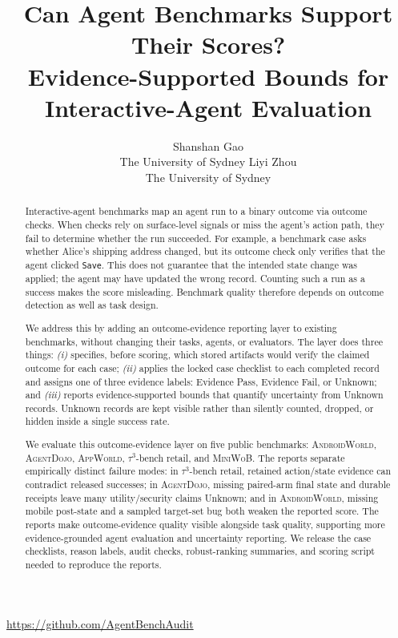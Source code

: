 \documentclass{article}
\title{Can Agent Benchmarks Support Their Scores?\\
\large Evidence-Supported Bounds for Interactive-Agent Evaluation}
\author{
Shanshan Gao\\
The University of Sydney
\And
Liyi Zhou\\
The University of Sydney
}
\date{}
\newcommand{\agentdojo}{\textsc{AgentDojo}\xspace}
\newcommand{\appworld}{\textsc{AppWorld}\xspace}
\newcommand{\tauthree}{\(\tau^3\)-bench retail\xspace}
\newcommand{\androidworld}{\textsc{AndroidWorld}\xspace}
\newcommand{\miniwob}{\textsc{MiniWoB}\xspace}
\newcommand{\evidencePass}{Evidence Pass\xspace}
\newcommand{\evidenceFail}{Evidence Fail\xspace}
\newcommand{\unknownLabel}{Unknown\xspace}
\begin{document}
\maketitle

\begin{abstract}
Interactive-agent benchmarks map an agent run to a binary outcome via outcome
checks. When checks rely on surface-level signals or miss the agent's action
path, they fail to determine whether the run succeeded. For example, a
benchmark case asks whether Alice's shipping address changed, but its outcome
check only verifies that the agent clicked \texttt{Save}. This does not
guarantee that the intended state change was applied; the agent may have
updated the wrong record. Counting such a run as a success makes the score
misleading. Benchmark quality therefore depends on outcome detection as well as
task design.

We address this by adding an outcome-evidence reporting layer to existing
benchmarks, without changing their tasks, agents, or evaluators. The layer does
three things: \textit{(i)} specifies, before scoring, which stored artifacts
would verify the claimed outcome for each case; \textit{(ii)} applies the
locked case checklist to each completed record and assigns one of three
evidence labels: \evidencePass, \evidenceFail, or \unknownLabel; and
\textit{(iii)} reports evidence-supported bounds that quantify uncertainty from
Unknown records. Unknown records are kept visible rather than silently counted,
dropped, or hidden inside a single success rate.

We evaluate this outcome-evidence layer on five public benchmarks:
\androidworld, \agentdojo, \appworld, \tauthree, and \miniwob. The reports
separate empirically distinct failure modes: in \tauthree, retained action/state
evidence can contradict released successes; in \agentdojo, missing paired-arm
final state and durable receipts leave many utility/security claims Unknown; and
in \androidworld, missing mobile post-state and a sampled target-set bug both
weaken the reported score.
The reports make outcome-evidence quality visible alongside task
quality, supporting more evidence-grounded agent evaluation and uncertainty
reporting. We release the case checklists, reason labels, audit checks,
robust-ranking summaries, and scoring script needed to reproduce the reports.
\end{abstract}

\begin{center}
\scriptsize\url{https://github.com/AgentBenchAudit}
\end{center}
\end{document}
